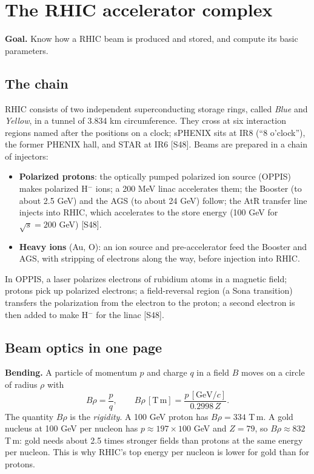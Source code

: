 \documentclass[11pt,letterpaper]{article}
\newcommand{\goal}[1]{\noindent\textbf{Goal.} #1\par}
\begin{document}
\section{The RHIC accelerator complex}\label{sec:rhic}
\goal{Know how a RHIC beam is produced and stored, and compute its basic parameters.}

\subsection{The chain}
RHIC consists of two independent superconducting storage rings, called \emph{Blue} and \emph{Yellow}, in a tunnel of
3.834 km circumference. They cross at six interaction regions named after the positions on a clock; sPHENIX sits at IR8
(``8 o'clock''), the former PHENIX hall, and STAR at IR6 [S48]. Beams are prepared in a chain of injectors:
\begin{itemize}
\item \textbf{Polarized protons}: the optically pumped polarized ion source (OPPIS) makes polarized H$^-$ ions; a 200 MeV
linac accelerates them; the Booster (to about 2.5 GeV) and the AGS (to about 24 GeV) follow; the AtR transfer line injects into
RHIC, which accelerates to the store energy (100 GeV for $\sqrt s=200$ GeV) [S48].
\item \textbf{Heavy ions} (Au, O): an ion source and pre-accelerator feed the Booster and AGS, with stripping of electrons
along the way, before injection into RHIC.
\end{itemize}
In OPPIS, a laser polarizes electrons of rubidium atoms in a magnetic field; protons pick up polarized electrons;
a field-reversal region (a Sona transition) transfers the polarization from the electron to the proton; a second electron
is then added to make H$^-$ for the linac [S48].

\subsection{Beam optics in one page}
\textbf{Bending.} A particle of momentum $p$ and charge $q$ in a field $B$ moves on a circle of radius $\rho$ with
\begin{equation}
B\rho=\frac{p}{q},\qquad B\rho\,[\mathrm{T\,m}]=\frac{p\,[\mathrm{GeV}/c]}{0.2998\,Z}.
\end{equation}
The quantity $B\rho$ is the \emph{rigidity}. A 100 GeV proton has $B\rho=334$ T\,m. A gold nucleus at 100 GeV per nucleon has
$p\approx197\times100$ GeV and $Z=79$, so $B\rho\approx832$ T\,m: gold needs about 2.5 times stronger fields than protons at
the same energy per nucleon. This is why RHIC's top energy per nucleon is lower for gold than for protons.
\end{document}
